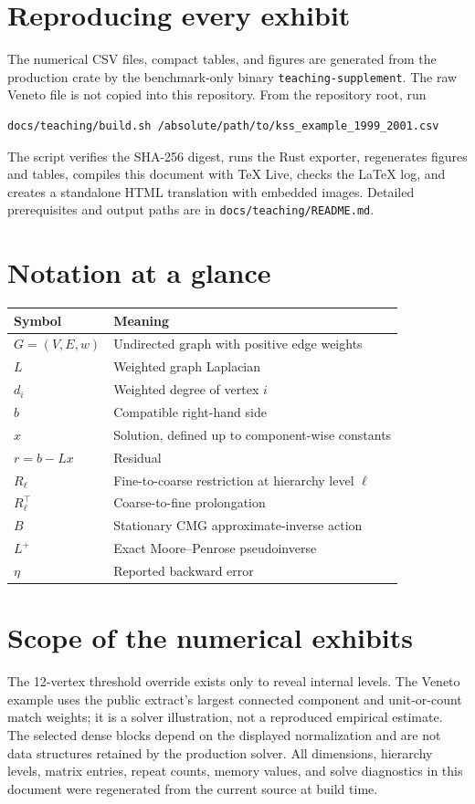 \documentclass[11pt]{article}
\newcommand{\code}[1]{\texttt{#1}}
\begin{document}
\section{Reproducing every exhibit}

The numerical CSV files, compact tables, and figures are generated from the production crate by the benchmark-only binary \code{teaching-supplement}.  The raw Veneto file is not copied into this repository.  From the repository root, run
\begin{verbatim}
docs/teaching/build.sh /absolute/path/to/kss_example_1999_2001.csv
\end{verbatim}
The script verifies the SHA-256 digest, runs the Rust exporter, regenerates figures and tables, compiles this document with TeX Live, checks the LaTeX log, and creates a standalone HTML translation with embedded images.  Detailed prerequisites and output paths are in \code{docs/teaching/README.md}.

\appendix
\section{Notation at a glance}

\begin{longtable}{ll}
\toprule
Symbol & Meaning\\
\midrule
$G=(V,E,w)$ & Undirected graph with positive edge weights\\
$L$ & Weighted graph Laplacian\\
$d_i$ & Weighted degree of vertex $i$\\
$b$ & Compatible right-hand side\\
$x$ & Solution, defined up to component-wise constants\\
$r=b-Lx$ & Residual\\
$R_\ell$ & Fine-to-coarse restriction at hierarchy level $\ell$\\
$R_\ell^\top$ & Coarse-to-fine prolongation\\
$B$ & Stationary CMG approximate-inverse action\\
$L^+$ & Exact Moore--Penrose pseudoinverse\\
$\eta$ & Reported backward error\\
\bottomrule
\end{longtable}

\section{Scope of the numerical exhibits}

The 12-vertex threshold override exists only to reveal internal levels.  The Veneto example uses the public extract's largest connected component and unit-or-count match weights; it is a solver illustration, not a reproduced empirical estimate.  The selected dense blocks depend on the displayed normalization and are not data structures retained by the production solver.  All dimensions, hierarchy levels, matrix entries, repeat counts, memory values, and solve diagnostics in this document were regenerated from the current source at build time.

{\small
\setlength{\bibsep}{0.25em}


}
\end{document}
